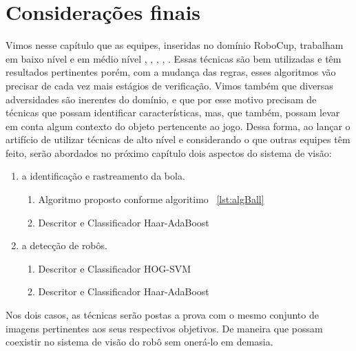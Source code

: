 \section{Considerações finais}

Vimos nesse capítulo que as equipes, inseridas no domínio RoboCup, trabalham em baixo nível e em médio nível \cite{AUTMan}, \cite{Bold}, \cite{CIT}, \cite{Baset}, \cite{EROS}. Essas técnicas são bem utilizadas e têm resultados pertinentes porém, com a mudança das regras, esses algoritmos vão precisar de cada vez mais estágios de verificação. Vimos também que diversas adversidades são inerentes do domínio, e que por esse motivo precisam de técnicas que possam identificar características, mas, que também, possam levar em conta algum contexto do objeto pertencente ao jogo.
Dessa forma, ao lançar o artifício de utilizar técnicas de alto nível e considerando o que outras equipes têm feito, serão abordados no próximo capítulo dois aspectos do sistema de visão: 

\begin{enumerate}
	\item a identificação e rastreamento da bola.
		\begin{enumerate}
			\item Algoritmo proposto conforme algoritimo ~\ref{lst:algBall}
			\item Descritor e Classificador Haar-AdaBoost
		\end{enumerate}
	\item a detecção de robôs.
		\begin{enumerate}
			\item Descritor e Classificador HOG-SVM
			\item Descritor e Classificador Haar-AdaBoost
		\end{enumerate}
\end{enumerate}

Nos dois casos, as técnicas serão postas a prova com o mesmo conjunto de imagens pertinentes aos seus respectivos objetivos. De maneira que possam coexistir no sistema de visão do robô sem onerá-lo em demasia.





